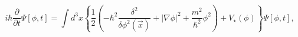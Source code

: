 \begin{equation}
i\hbar\frac{\partial}{\partial t}\Psi\left[  \phi,t\right]  =\int
d^{3}x\left\{  \frac{1}{2}\left(  -\hbar^{2}\frac{\delta^{2}}{\delta\phi
^{2}\left(  \vec{x}\right)  }+\left|  \nabla\phi\right|  ^{2}+\frac{m^{2}%
}{\hbar^{2}}\phi^{2}\right)  +V_{\star}\left(  \phi\right)  \right\}
\Psi\left[  \phi,t\right]  ,\label{3}%
\end{equation}

